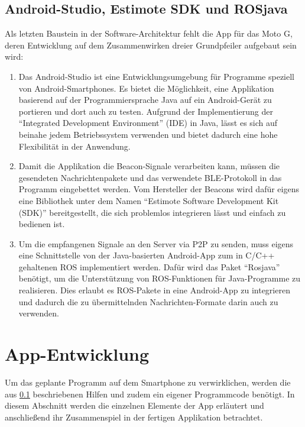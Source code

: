 \subsection{Android-Studio, Estimote SDK und ROSjava}\label{sec:Hilfen}
Als letzten Baustein in der Software-Architektur fehlt die App für das Moto G, deren Entwicklung auf dem Zusammenwirken dreier Grundpfeiler aufgebaut sein wird:
\begin{enumerate}
\item Das Android-Studio \cite{AndStu} ist eine Entwicklungsumgebung für Programme speziell von Android-Smartphones. Es bietet die Möglichkeit, eine Applikation basierend auf der Programmiersprache Java auf ein Android-Gerät zu portieren und dort auch zu testen. Aufgrund der Implementierung der "`Integrated Development Environment"' (IDE) in Java, lässt es sich auf beinahe jedem Betriebssystem verwenden und bietet dadurch eine hohe Flexibilität in der Anwendung.
\item Damit die Applikation die Beacon-Signale verarbeiten kann, müssen die gesendeten Nachrichtenpakete und das verwendete BLE-Protokoll in das Programm eingebettet werden. Vom Hersteller der Beacons wird dafür eigens eine Bibliothek unter dem Namen "`Estimote Software Development Kit (SDK)"' \cite{EstSDK} bereitgestellt, die sich problemlos integrieren lässt und einfach zu bedienen ist.
\item Um die empfangenen Signale an den Server via P2P zu senden, muss eigens eine Schnittstelle von der Java-basierten Android-App zum in C/C++ gehaltenen ROS implementiert werden. Dafür wird das Paket "`Rosjava"' \cite{ROSjava} benötigt, um die Unterstützung von ROS-Funktionen für Java-Programme zu realisieren. Dies erlaubt es ROS-Pakete in eine Android-App zu integrieren und dadurch die zu übermittelnden Nachrichten-Formate darin auch zu verwenden.
\end{enumerate}
\section{App-Entwicklung}
Um das geplante Programm auf dem Smartphone zu verwirklichen, werden die aus \ref{sec:Hilfen} beschriebenen Hilfen und zudem ein eigener Programmcode benötigt. In diesem Abschnitt werden die einzelnen Elemente der App erläutert und anschließend ihr Zusammenspiel in der fertigen Applikation betrachtet. 
